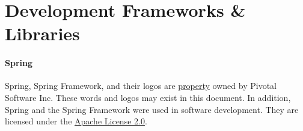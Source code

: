 \TODO

\section*{Development Frameworks \& Libraries}

    \paragraph{Spring}
    Spring, Spring Framework, and their logos are \href{https://spring.io/trademarks}{property} owned by Pivotal Software Inc. These words and logos may exist in this document. In addition, Spring and the Spring Framework were used in software development. They are licensed under the \href{https://www.apache.org/licenses/LICENSE-2.0}{Apache License 2.0}.
